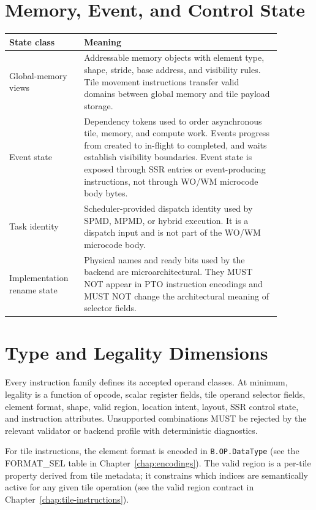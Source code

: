 \section{Memory, Event, and Control State}
\begin{longtable}{@{}L{0.23\linewidth}L{0.65\linewidth}@{}}
\toprule
State class & Meaning \\
\midrule
Global-memory views & Addressable memory objects with element type, shape, stride, base address, and visibility rules. Tile movement instructions transfer valid domains between global memory and tile payload storage. \\
Event state & Dependency tokens used to order asynchronous tile, memory, and compute work. Events progress from created to in-flight to completed, and waits establish visibility boundaries. Event state is exposed through SSR entries or event-producing instructions, not through WO/WM microcode body bytes. \\
Task identity & Scheduler-provided dispatch identity used by SPMD, MPMD, or hybrid execution. It is a dispatch input and is not part of the WO/WM microcode body. \\
Implementation rename state & Physical names and ready bits used by the backend are microarchitectural. They MUST NOT appear in PTO instruction encodings and MUST NOT change the architectural meaning of selector fields. \\
\bottomrule
\end{longtable}

\section{Type and Legality Dimensions}
Every instruction family defines its accepted operand classes. At minimum, legality is a function of opcode, scalar register fields, tile operand selector fields, element format, shape, valid region, location intent, layout, SSR control state, and instruction attributes. Unsupported combinations MUST be rejected by the relevant validator or backend profile with deterministic diagnostics.

For tile instructions, the element format is encoded in \texttt{B.OP.DataType} (see the FORMAT\_SEL table in Chapter~\ref{chap:encodings}). The valid region is a per-tile property derived from tile metadata; it constrains which indices are semantically active for any given tile operation (see the valid region contract in Chapter~\ref{chap:tile-instructions}).

